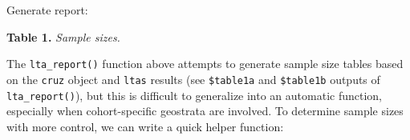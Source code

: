 \documentclass[
]{book}
\newenvironment{Shaded}{\begin{snugshade}}{\end{snugshade}}
\newcommand{\AttributeTok}[1]{\textcolor[rgb]{0.77,0.63,0.00}{#1}}
\newcommand{\ControlFlowTok}[1]{\textcolor[rgb]{0.13,0.29,0.53}{\textbf{#1}}}
\newcommand{\FunctionTok}[1]{\textcolor[rgb]{0.00,0.00,0.00}{#1}}
\newcommand{\NormalTok}[1]{#1}
\newcommand{\OtherTok}[1]{\textcolor[rgb]{0.56,0.35,0.01}{#1}}
\newcommand{\SpecialCharTok}[1]{\textcolor[rgb]{0.00,0.00,0.00}{#1}}
\begin{document}
Generate report:

\begin{Shaded}
\end{Shaded}

\textbf{Table 1.} \emph{Sample sizes.}

The \texttt{lta\_report()} function above attempts to generate sample size tables based on the \texttt{cruz} object and \texttt{ltas} results (see \texttt{\$table1a} and \texttt{\$table1b} outputs of \texttt{lta\_report()}), but this is difficult to generalize into an automatic function, especially when cohort-specific geostrata are involved. To determine sample sizes with more control, we can write a quick helper function:
\end{document}
